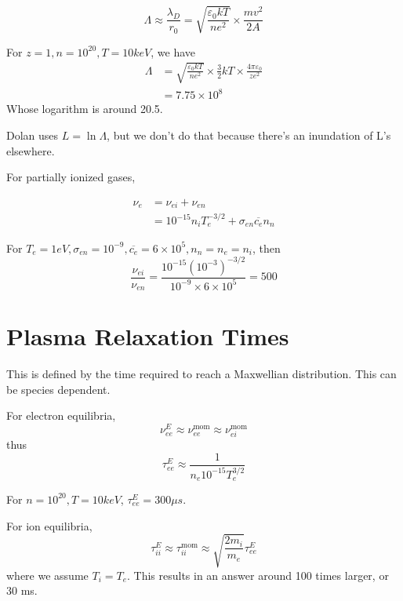 \documentclass[12pt]{article}
\begin{document}
$$\Lambda \approx \frac{\lambda_D}{r_0} = \sqrt{\frac{\varepsilon_0kT}{ne^2}} \times \frac{mv^2}{2A}$$

\begin{ex}
    For $z=1,n=10^{20},T=10\unit{keV}$, we have
    \begin{align*}
        \Lambda &= \sqrt{\frac{\varepsilon_0kT}{ne^2}} \times \frac{3}{2}kT \times \frac{4\pi\varepsilon_0}{ze^2} \\
                &= 7.75 \times 10^8
    \end{align*}
    Whose logarithm is around 20.5.
\end{ex}

Dolan uses $L = \ln\Lambda$, but we don't do that because there's an inundation of L's elsewhere.

For partially ionized gases,

\begin{align*}
    \nu_e &= \nu_{ei} + \nu_{en} \\
          &= 10^{-15}n_iT_e^{-3/2} + \sigma_{en}\overline{c_e}n_n
\end{align*}

\begin{ex}
    For $T_e = 1\unit{eV}, \sigma_{en} = 10^{-9}, \overline{c_e} = 6 \times 10^5, n_n = n_e = n_i$, then
    $$\frac{\nu_{ei}}{\nu_{en}} = \frac{10^{-15}(10^{-3})^{-3/2}}{10^{-9} \times 6 \times 10^5} = 500$$
\end{ex}

\section{Plasma Relaxation Times}
    
\begin{defn}
    This is defined by the time required to reach a Maxwellian distribution. This can be species dependent.
\end{defn}

For electron equilibria,
$$\nu_{ee}^E \approx \nu_{ee}^{\text{mom}} \approx \nu_{ei}^{\text{mom}}$$
thus
$$\tau_{ee}^E \approx \frac{1}{n_e10^{-15}T_e^{3/2}}$$

\begin{ex}
    For $n=10^{20}, T = 10\unit{keV}$, $\tau_{ee}^E = 300\unit{\mu s}$.
\end{ex}

For ion equilibria,
$$\tau_{ii}^E \approx \tau_{ii}^{\text{mom}} \approx \sqrt{\frac{2m_i}{m_e}}\tau_{ee}^E$$
where we assume $T_i = T_e$. This results in an answer around 100 times larger, or 30 ms. \\
\end{document}
